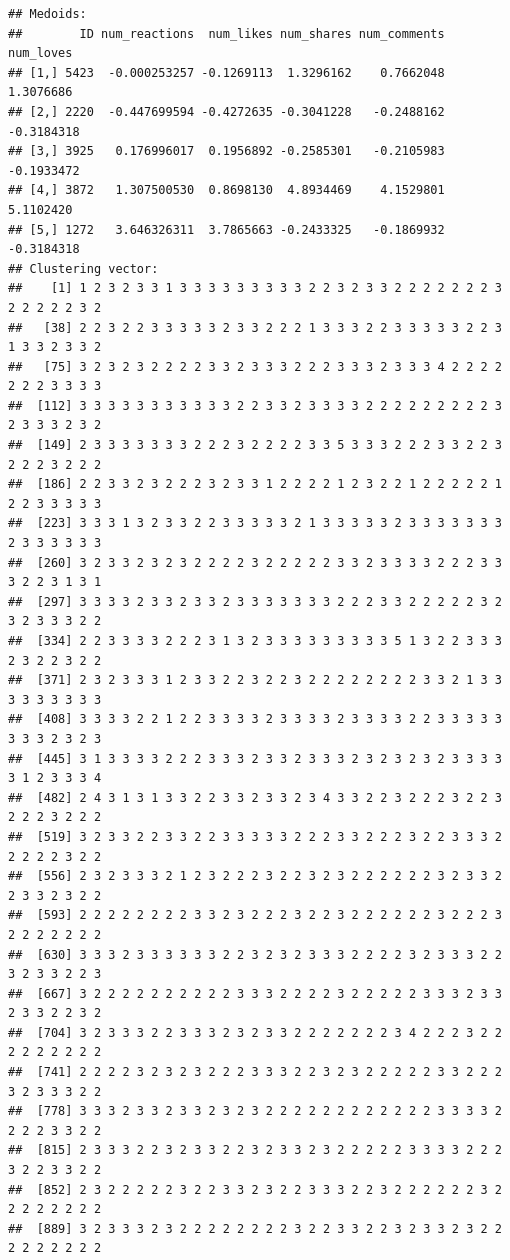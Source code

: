 \documentclass[
]{article}
\begin{document}
\begin{verbatim}
## Medoids:
##        ID num_reactions  num_likes num_shares num_comments  num_loves
## [1,] 5423  -0.000253257 -0.1269113  1.3296162    0.7662048  1.3076686
## [2,] 2220  -0.447699594 -0.4272635 -0.3041228   -0.2488162 -0.3184318
## [3,] 3925   0.176996017  0.1956892 -0.2585301   -0.2105983 -0.1933472
## [4,] 3872   1.307500530  0.8698130  4.8934469    4.1529801  5.1102420
## [5,] 1272   3.646326311  3.7865663 -0.2433325   -0.1869932 -0.3184318
## Clustering vector:
##    [1] 1 2 3 2 3 3 1 3 3 3 3 3 3 3 3 3 2 2 3 2 3 3 2 2 2 2 2 2 2 3 2 2 2 2 2 3 2
##   [38] 2 2 3 2 2 3 3 3 3 3 2 3 3 2 2 2 1 3 3 3 2 2 3 3 3 3 3 2 2 3 1 3 3 2 3 3 2
##   [75] 3 2 3 2 3 2 2 2 2 3 3 2 3 3 3 2 2 2 3 3 3 2 3 3 3 4 2 2 2 2 2 2 2 3 3 3 3
##  [112] 3 3 3 3 3 3 3 3 3 3 3 2 2 3 3 2 3 3 3 3 2 2 2 2 2 2 2 2 2 3 2 3 3 3 2 3 2
##  [149] 2 3 3 3 3 3 3 3 2 2 2 3 2 2 2 2 3 3 5 3 3 3 2 2 2 3 3 2 2 3 2 2 2 3 2 2 2
##  [186] 2 2 3 3 2 3 2 2 2 3 2 3 3 1 2 2 2 2 1 2 3 2 2 1 2 2 2 2 2 1 2 2 3 3 3 3 3
##  [223] 3 3 3 1 3 2 3 3 2 2 3 3 3 3 3 2 1 3 3 3 3 3 2 3 3 3 3 3 3 3 2 3 3 3 3 3 3
##  [260] 3 2 3 3 2 3 2 3 2 2 2 2 3 2 2 2 2 2 3 3 2 3 3 3 3 2 2 2 3 3 3 2 2 3 1 3 1
##  [297] 3 3 3 3 2 3 3 2 3 3 2 3 3 3 3 3 3 3 2 2 2 3 3 2 2 2 2 2 3 2 3 2 3 3 3 2 2
##  [334] 2 2 3 3 3 3 2 2 2 3 1 3 2 3 3 3 3 3 3 3 3 3 5 1 3 2 2 3 3 3 2 3 2 2 3 2 2
##  [371] 2 3 2 3 3 3 1 2 3 3 2 2 3 2 2 3 2 2 2 2 2 2 2 2 3 3 2 1 3 3 3 3 3 3 3 3 3
##  [408] 3 3 3 3 2 2 1 2 2 3 3 3 3 2 3 3 3 3 2 3 3 3 3 2 2 3 3 3 3 3 3 3 3 2 3 2 3
##  [445] 3 1 3 3 3 3 2 2 2 3 3 3 2 3 3 2 3 3 3 2 3 2 3 2 3 2 3 3 3 3 3 1 2 3 3 3 4
##  [482] 2 4 3 1 3 1 3 3 2 2 3 3 2 3 3 2 3 4 3 3 2 2 3 2 2 2 3 2 2 3 2 2 2 3 2 2 2
##  [519] 3 2 3 3 2 2 3 3 2 2 3 3 3 3 3 2 2 2 3 3 2 2 2 3 2 2 3 3 3 2 2 2 2 2 3 2 2
##  [556] 2 3 2 3 3 3 2 1 2 3 2 2 2 3 2 2 3 2 3 2 2 2 2 2 2 3 2 3 3 2 2 3 3 2 3 2 2
##  [593] 2 2 2 2 2 2 2 2 3 3 2 3 2 2 2 3 2 2 3 2 2 2 2 2 2 3 2 2 2 3 2 2 2 2 2 2 2
##  [630] 3 3 3 2 3 3 3 3 3 3 2 2 3 2 3 2 3 3 3 2 2 2 2 3 2 3 3 3 2 2 3 2 3 3 2 2 3
##  [667] 3 2 2 2 2 2 2 2 2 2 2 3 3 3 2 2 2 2 3 2 2 2 2 2 3 3 3 2 3 3 2 3 3 2 2 3 2
##  [704] 3 2 3 3 3 2 2 3 3 3 2 3 2 3 3 2 2 2 2 2 2 2 3 4 2 2 2 3 2 2 2 2 2 2 2 2 2
##  [741] 2 2 2 2 3 2 3 2 3 2 2 2 3 3 3 2 2 3 2 3 2 2 2 2 2 3 3 2 2 2 3 2 3 3 3 2 2
##  [778] 3 3 3 2 3 3 2 3 3 2 3 2 3 2 2 2 2 2 2 2 2 2 2 2 2 3 3 3 3 2 2 2 2 3 3 2 2
##  [815] 2 3 3 3 2 2 3 2 3 3 2 2 3 2 3 3 2 3 2 2 2 2 2 3 3 3 3 2 2 2 3 2 2 3 3 2 2
##  [852] 2 3 2 2 2 2 2 3 2 2 3 3 2 3 2 2 3 3 3 2 2 3 2 2 2 2 2 2 3 2 2 2 2 2 2 2 2
##  [889] 3 2 3 3 3 2 3 2 2 2 2 2 2 2 2 3 2 2 3 3 2 2 3 2 3 3 2 3 2 2 2 2 2 2 2 2 2

\end{verbatim}
\end{document}
